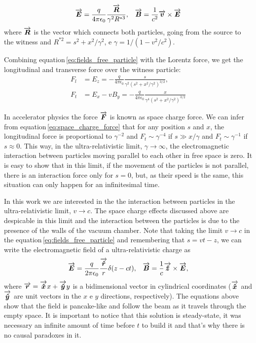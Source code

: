 \begin{apendicesenv}
    \begin{align}\label{eq:fields_free_particle}
    	\overrightarrow{\boldsymbol{E}} = \frac{q}{4\pi\epsilon_0}\frac{\overrightarrow{\boldsymbol{R}}}{\gamma^2 R^{*3}}, & & \overrightarrow{\boldsymbol{B}} = \frac{1}{c^2}\overrightarrow{\boldsymbol{v}} \times \overrightarrow{\boldsymbol{E}}
    \end{align}
    where $\overrightarrow{\boldsymbol{R}}$ is the vector which connects both particles, going from the source to the witness and  $R^{*2} = s^2 + x^2/\gamma^2$, e $\gamma = 1/(1-v^2/c^2)$.

    Combining equation\,\ref{eq:fields_free_particle} with the Lorentz force, we get the longitudinal and transverse force over the witness particle:
    \begin{align}\label{eq:space_charge_force}
    	F_l &= E_z = -\frac{q}{4\pi\epsilon_0}\frac{s}{\gamma^2\left(s^2+x^2/\gamma^2\right)^{3/2}}, \\
    	F_t &= E_x - vB_y = -\frac{q}{4\pi\epsilon_0}\frac{x}{\gamma^4\left(s^2+x^2/\gamma^2\right)^{3/2}}
    \end{align}

    In accelerator physics the force $\overrightarrow{\boldsymbol{F}}$ is known as space charge force. We can infer from equation\,\ref{eq:space_charge_force} that for any position $s$ and $x$, the longitudinal force is proportional to $\gamma^{-2}$ and $F_t \sim \gamma^{-4}$ if $s \gg x/\gamma$ and  $F_t \sim \gamma^{-1}$ if $s \approx 0$. This way, in the ultra-relativistic limit, $\gamma \to \infty$, the electromagnetic interaction between particles moving parallel to each other in free space is zero. It is easy to show that in this limit, if the movement of the particles is not parallel, there is an interaction force only for $s=0$, but, as their speed is the same, this situation can only happen for an infinitesimal time.

    In this work we are interested in the the interaction between particles in the ultra-relativistic limit, $v \to c$. The space charge effects discussed above are despicable in this limit and the interaction between the particles is due to the presence of the walls of the vacuum chamber. Note that taking the limit $v \to c$ in the equation\,\ref{eq:fields_free_particle} and remembering that $s = vt - z$, we can write the electromagnetic field of a ultra-relativistic charge as
    \begin{align}
    	\overrightarrow{\boldsymbol{E}} =
		\frac{q}{2\pi\epsilon_0}\frac{\overrightarrow{\boldsymbol{\hat{r}}}}{r}\delta(z-ct), &
		& \overrightarrow{\boldsymbol{B}} =\frac{1}{c}\overrightarrow{\boldsymbol{\hat{z}}}\times\overrightarrow{\boldsymbol{E}},
    \end{align}
    where $\overrightarrow{\boldsymbol{r}} = \overrightarrow{\boldsymbol{\hat{x}}}x + \overrightarrow{\boldsymbol{\hat{y}}}y$ is a bidimensional vector in cylindrical coordinates ($\overrightarrow{\boldsymbol{\hat{x}}}$ and $\overrightarrow{\boldsymbol{\hat{y}}}$ are unit vectors in the $x$ e $y$ directions, respectively). The equations above show that the field is pancake-like and follow the beam as it travels through the empty space. It is important to notice that this solution is steady-state, it was necessary an infinite amount of time before $t$ to build it and that's why there is no causal paradoxes in it.


\end{apendicesenv}
